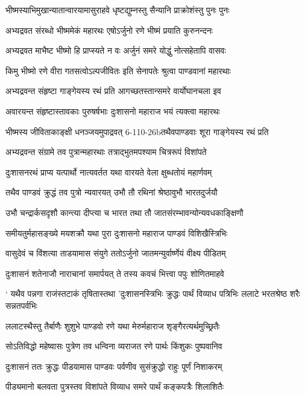 \twolineshloka
{भीष्मस्याभिमुखान्यातान्वारयामासुराहवे}
{धृष्टद्युम्नस्तु सैन्यानि प्राक्रोशंस्तु पुनः पुनः}


\twolineshloka
{अभ्यद्रवत संरब्धो भीष्ममेकं महारथः}
{एषोऽर्जुनो रणे भीष्मं प्रयाति कुरुनन्दनः}


\twolineshloka
{अभ्यद्रवत माभैष्ट भीष्मो हि प्राप्स्यते न वः}
{अर्जुनं समरे योद्धुं नोत्सहेतापि वासवः}


\twolineshloka
{किमु भीष्मो रणे वीरा गतसत्वोऽल्पजीवितः}
{इति सेनापतेः श्रुत्वा पाण्डवानां महारथाः}


\twolineshloka
{अभ्यद्रवन्त संहृष्टा गाङ्गेयस्य रथं प्रति}
{आगच्छतस्तान्समरे वार्योघानचला इव}


\twolineshloka
{अवारयन्त संहृष्टास्तावकाः पुरुषर्षभाः}
{दुःशासनो महाराज भयं त्यक्त्वा महारथः}


\twolineshloka
{भीष्मस्य जीविताकाङ्क्षी धनञ्जयमुपाद्रवत्}
{6-110-26bतथैवपाण्डवाः शूरा गाङ्गेयस्य रथं प्रति}


\twolineshloka
{अभ्यद्रवन्त संग्रामे तव पुत्रान्महारथाः}
{तत्राद्भुतमपश्याम चित्ररूपं विशांपते}


\twolineshloka
{दुःशासनरथं प्राप्य यत्पार्थो नात्यवर्तत}
{यथा वारयते वेला क्षुब्धतोयं महार्णवम्}


\twolineshloka
{तथैव पाण्डवं क्रुद्धं तव पुत्रो न्यवारयत्}
{उभौ तौ रथिनां श्रेष्ठावुभौ भारतदुर्जयौ}


\twolineshloka
{उभौ चन्द्रार्कसदृशौ कान्त्या दीप्त्या च भारत}
{तथा तौ जातसंरम्भावन्योन्यवधकाङ्क्षिणौ}


\twolineshloka
{समीयतुर्महासङ्ख्ये मयशक्रौ यथा पुरा}
{दुःशासनो महाराज पाण्डवं विशिखैस्त्रिभिः}


\twolineshloka
{वासुदेवं च विंशत्या ताडयामास संयुगे}
{ततोऽर्जुनो जातमन्युर्वार्ष्णेयं वीक्ष्य पीडितम्}


\twolineshloka
{दुःशासनं शतेनाजौ नाराचानां समार्पयत्}
{ते तस्य कवचं भित्त्वा पपुः शोणितमाहवे}


\threelineshloka
{` यथैव पन्नगा राजंस्तटाकं तृषितास्तथा}
{'दुःशासनस्त्रिभिः क्रुद्धः पार्थं विव्याध पत्रिभिः}
{ललाटे भरतश्रेष्ठ शरैः सन्नतपर्वभिः}


\twolineshloka
{ललाटस्थैस्तु तैर्बाणैः शुशुभे पाण्डवो रणे}
{यथा मेरुर्महाराज शृङ्गैरत्यर्थमुच्छ्रितैः}


\twolineshloka
{सोऽतिविद्धो महेष्वासः पुत्रेण तव धन्विना}
{व्यराजत रणे पार्थः किंशुकः पुष्पवानिव}


\twolineshloka
{दुःशासनं ततः क्रुद्धः पीडयामास पाण्डवः}
{पर्वणीव सुसंक्रुद्धो राहुः पूर्णं निशाकरम्}


\twolineshloka
{पीड्यमानो बलवता पुत्रस्तव विशांपते}
{विव्याध समरे पार्थं कङ्कपत्रैः शिलाशितैः}


